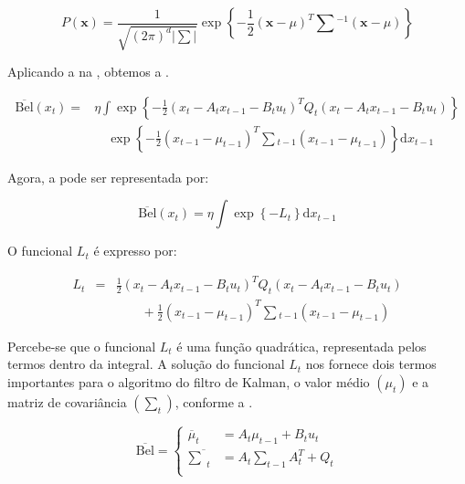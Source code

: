 \begin{equation}
    \label{eq:bayes03}
    P(\mathbf{x}) = \frac{1}{\sqrt{(2\pi)^{d}|\sum|}}\exp\left\{-\frac{1}{2} (\mathbf{x}-\mu)^T\textstyle\sum{}^{-1}(\mathbf{x}-\mu)\right\}
\end{equation}        

Aplicando a  na , obtemos a .

\begin{equation}
    \begin{matrix}
        \label{eq:bayes04}
        \overline{\text{Bel}}(x_t)= &  \eta \displaystyle\int \exp\left\{  -\frac{1}{2} \left(x_t - A_t x_{t-1} - B_t u_t\right)^T Q_t \left(x_t - A_t x_{t-1} - B_t u_t\right)  \right\} \\
        & \quad\exp\left\{ -\displaystyle\frac{1}{2} \left(x_{t-1} - \mu_{t-1}\right)^T \textstyle\sum {}_{t-1} \left(x_{t-1} - \mu_{t-1}\right)  \right\}\text{d}x_{t-1}
    \end{matrix}
\end{equation}

Agora, a  pode ser representada por:

\begin{equation}
    \overline{\text{Bel}}(x_t)= \eta \displaystyle\int \exp\left\{ -L_t \right\}\text{d}x_{t-1}
\end{equation}

O funcional $L_t$ é expresso por:

\begin{equation}
    \begin{matrix}
        L_t&  = & \displaystyle\frac{1}{2} \left(x_t - A_t x_{t-1} - B_t u_t\right)^T Q_t \left(x_t - A_t x_{t-1} - B_t u_t\right) \\
        & & \quad\quad + \displaystyle\frac{1}{2} \left(x_{t-1} - \mu_{t-1}\right)^T \textstyle\sum {}_{t-1} \left(x_{t-1} - \mu_{t-1}\right)
    \end{matrix}
\end{equation}

Percebe-se que o funcional $L_t$ é uma função quadrática, representada pelos termos dentro da integral. A solução do funcional $L_t$ nos fornece dois termos importantes para o algoritmo do filtro de Kalman, o valor médio $\left(\mu_t\right)$ e a matriz de covariância $\left(\sum_t\right)$, conforme a .

\begin{equation}
    \overline{\text{Bel}} = 
    \left\{
    \begin{aligned}
            \overline{\mu}_t & = A_t\mu_{t-1} + B_t u_t\\
            \overline{\textstyle\sum}_t & = A_t {\textstyle\sum}_{t-1} A_t^T+ Q_t\\
    \end{aligned} \right.
    \label{eq:bayes05}
\end{equation}

